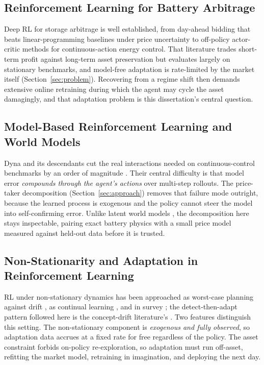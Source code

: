 \documentclass[conference]{IEEEtran}
\begin{document}
\subsection{Reinforcement Learning for Battery Arbitrage}

Deep RL for storage arbitrage is well established, from day-ahead bidding that beats linear-programming baselines under price uncertainty \citep{cao2020arbitrage} to off-policy actor-critic methods \citep{haarnoja2018softactorcriticoffpolicymaximum} for continuous-action energy control. That literature trades short-term profit against long-term asset preservation but evaluates largely on stationary benchmarks, and model-free adaptation is rate-limited by the market itself (Section~\ref{sec:problem}). Recovering from a regime shift then demands extensive online retraining during which the agent may cycle the asset damagingly, and that adaptation problem is this dissertation's central question.

\subsection{Model-Based Reinforcement Learning and World Models}

Dyna and its descendants cut the real interactions needed on continuous-control benchmarks by an order of magnitude \citep{janner2019mbpo, chua2018pets}. Their central difficulty is that model error \emph{compounds through the agent's actions} over multi-step rollouts. The price-taker decomposition (Section~\ref{sec:approach}) removes that failure mode outright, because the learned process is exogenous and the policy cannot steer the model into self-confirming error. Unlike latent world models \citep{hafner2020dreamer}, the decomposition here stays inspectable, pairing exact battery physics with a small price model measured against held-out data before it is trusted.

\subsection{Non-Stationarity and Adaptation in Reinforcement Learning}

RL under non-stationary dynamics has been approached as worst-case planning against drift \citep{lecarpentier2019nonstationary}, as continual learning \citep{khetarpal2022continualrl}, and in survey \citep{padakandla2021survey}; the detect-then-adapt pattern followed here is the concept-drift literature's \citep{gama2014conceptdrift}. Two features distinguish this setting. The non-stationary component is \emph{exogenous and fully observed}, so adaptation data accrues at a fixed rate for free regardless of the policy. The asset constraint forbids on-policy re-exploration, so adaptation must run off-asset, refitting the market model, retraining in imagination, and deploying the next day.
\end{document}
